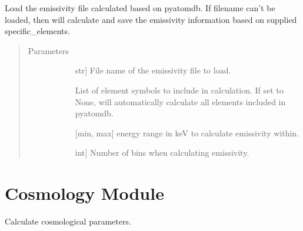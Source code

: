 \documentclass[letterpaper,10pt,english]{sphinxmanual}
\begin{document}

\begin{fulllineitems}
\label{\detokenize{prepare_pyatomdb:modules.prepare_pyatomdb.load_emissivity_file}}
Load the emissivity file calculated based on pyatomdb.
If filename can’t be loaded, then will calculate and save
the emissivity information based on supplied specific\_elements.
\begin{quote}\begin{description}
\item[{Parameters}] \leavevmode\begin{description}
\item[{}] \leavevmode{[}str{]}
File name of the emissivity file to load.

\item[{}] \leavevmode
List of element symbols to include in calculation. 
If set to None, will automatically calculate all 
elements included in pyatomdb.

\item[{}] \leavevmode
{[}min, max{]} energy range in keV to calculate emissivity within.

\item[{}] \leavevmode{[}int{]}
Number of bins when calculating emissivity.

\end{description}

\end{description}\end{quote}

\end{fulllineitems}



\section{Cosmology Module}
\label{\detokenize{cosmology:module-modules.cosmology}}\label{\detokenize{cosmology:cosmology-module}}\label{\detokenize{cosmology::doc}}
Calculate cosmological parameters.
\end{document}

